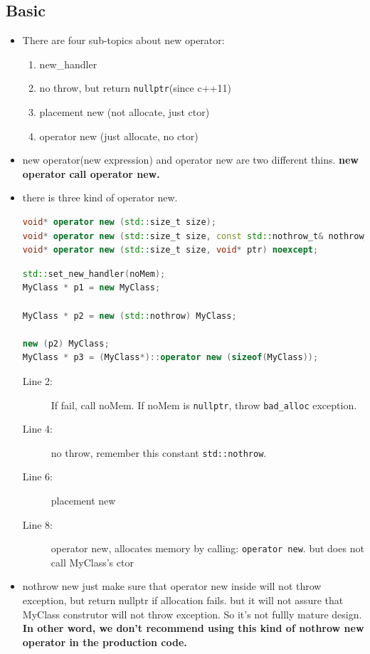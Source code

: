 \documentclass[a4paper,11pt,twoside]{book}
\begin{document}
\subsection{Basic}
\begin{itemize}
	\item There are four sub-topics about new operator:
	\begin{enumerate}
		\item new\_handler
		\item no throw, but return \texttt{nullptr}(since c++11)
		\item placement new (not allocate, just ctor)
		\item operator new (just allocate, no ctor)
	\end{enumerate}
	
	\item new operator(new expression) and operator new are two different thins. \textbf{new operator call operator new.} 
	
	\item there is three kind of operator new.
\begin{lstlisting}[frame=single, language=c++]
void* operator new (std::size_t size);
void* operator new (std::size_t size, const std::nothrow_t& nothrow_value) noexcept;
void* operator new (std::size_t size, void* ptr) noexcept;
\end{lstlisting}
	
\begin{lstlisting}[frame=single, language=c++]
std::set_new_handler(noMem);
MyClass * p1 = new MyClass;  

MyClass * p2 = new (std::nothrow) MyClass; 

new (p2) MyClass;  
MyClass * p3 = (MyClass*)::operator new (sizeof(MyClass));
\end{lstlisting}
\begin{description}
	\item[Line 2:] If fail, call noMem. If noMem is \texttt{nullptr}, throw \texttt{bad\_alloc} exception.
	\item[Line 4:] no throw, remember this constant \texttt{std::nothrow}.
	\item[Line 6:] placement new
	\item[Line 8:] operator new, allocates memory by calling: \texttt{operator new}. but does not call MyClass's ctor
\end{description}	

\item nothrow new just make sure that operator new inside will not throw exception, but return nullptr if allocation fails. but it will not assure that MyClass construtor will not throw exception. So it's not fullly mature design. \textbf{In other word, we don't recommend using this kind of nothrow new operator in the production code.}


\end{itemize}
\end{document}
